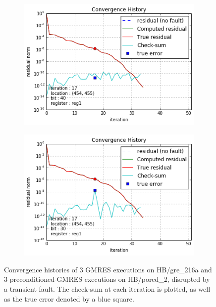 \begin{figure}[h]
\begin{minipage}[b]{0.48\linewidth}
	\quad
	\begin{subfigure}[t]{\linewidth}
		\centering
		\includegraphics[width=\linewidth]{figures/pores_2/convergence_history_checksum_1.png}
		\caption{}\label{fig:pores_2_conv_hist_checksum_1}
	\end{subfigure}
    \quad
    \begin{subfigure}[t]{\linewidth}
		\centering
		\includegraphics[width=\linewidth]{figures/pores_2/convergence_history_checksum_2.png}
		\caption{}\label{fig:pores_2_conv_hist_checksum_2}
	\end{subfigure}

    
	\end{minipage}
\caption{Convergence histories of 3 GMRES executions on HB/gre_216a and 3 preconditioned-GMRES executions on HB/pored_2, disrupted by a transient fault. The check-sum at each iteration is plotted, as well as the true error denoted by a blue square.} %
\label{fig:conv_hist_checksum}
\end{figure}






